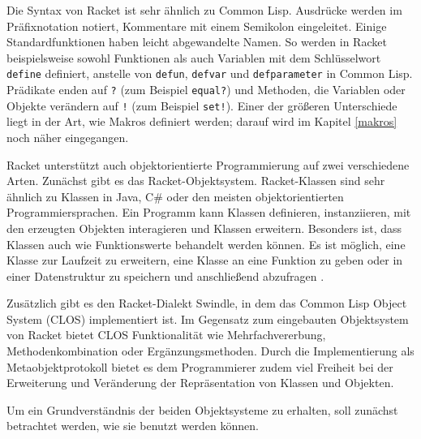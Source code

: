 Die Syntax von Racket ist sehr ähnlich zu Common Lisp. Ausdrücke werden im Präfixnotation notiert, Kommentare mit einem Semikolon eingeleitet. Einige Standardfunktionen haben leicht abgewandelte Namen. So werden in Racket beispielsweise sowohl Funktionen als auch Variablen mit dem Schlüsselwort \texttt{define} definiert, anstelle von \texttt{defun}, \texttt{defvar} und \texttt{defparameter} in Common Lisp. Prädikate enden auf \texttt{?} (zum Beispiel \texttt{equal?}) und Methoden, die Variablen oder Objekte verändern auf \texttt{!} (zum Beispiel \texttt{set!}). Einer der größeren Unterschiede liegt in der Art, wie Makros definiert werden; darauf wird im Kapitel \ref{makros} noch näher eingegangen.

Racket unterstützt auch objektorientierte Programmierung auf zwei verschiedene Arten. Zunächst gibt es das Racket-Objektsystem. Racket-Klassen sind sehr ähnlich zu Klassen in Java, C\# oder den meisten objektorientierten Programmiersprachen. Ein Programm kann Klassen definieren, instanziieren, mit den erzeugten Objekten interagieren und Klassen erweitern. Besonders ist, dass Klassen auch wie Funktionswerte behandelt werden können. Es ist möglich, eine Klasse zur Laufzeit zu erweitern, eine Klasse an eine Funktion zu geben oder in einer Datenstruktur zu speichern und anschließend abzufragen \cite{neu-edu}. 

Zusätzlich gibt es den Racket-Dialekt Swindle, in dem das Common Lisp Object System (CLOS) implementiert ist. Im Gegensatz zum eingebauten Objektsystem von Racket bietet CLOS Funktionalität wie Mehrfachvererbung, Methodenkombination oder Ergänzungsmethoden. Durch die Implementierung als Metaobjektprotokoll bietet es dem Programmierer zudem viel Freiheit bei der Erweiterung und Veränderung der Repräsentation von Klassen und Objekten.

Um ein Grundverständnis der beiden Objektsysteme zu erhalten, soll zunächst betrachtet werden, wie sie benutzt werden können. %

